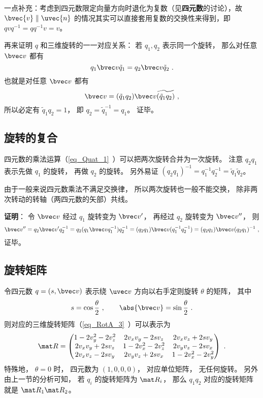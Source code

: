 一点补充：考虑到四元数限定向量方向时退化为复数（见\textbf{四元数}的讨论），故 $\bvec{v}\parallel{\uvec{n}}$ 的情况其实可以直接套用复数的交换性来得到，即 $qvq^{-1}=qq^{-1}v=v$。

再来证明 $q$ 和三维旋转的一一对应关系： 若 $q_1,q_2$ 表示同一个旋转， 那么对任意 $\bvec v$ 都有
\begin{equation}
q_1\bvec v \tilde q_1 = q_2\bvec v \tilde q_2~.
\end{equation}
也就是对任意 $\bvec v$ 都有
\begin{equation}
\bvec v = (\tilde q_1q_2)\bvec v \widetilde{(\tilde q_1q_2)}~,
\end{equation}
所以必定有 $\tilde q_1q_2 = 1$， 即 $q_2 = \tilde q_1^{-1} = q_1$。 证毕。

\subsection{旋转的复合}
四元数的乘法运算（\autoref{eq_Quat_1}~）可以把两次旋转合并为一次旋转。 注意 $q_2q_1$ 表示先做 $q_1$ 的旋转， 再做 $q_2$ 的旋转。 另外易证 $(q_2q_1)^{-1} = q_1^{-1} q_2^{-1} = \tilde q_1\tilde q_2$。

由于一般来说四元数乘法不满足交换律， 所以两次旋转也一般不能交换， 除非两次转动的转轴（两四元数的矢部）共线。

\textbf{证明}： 令 $\bvec v$ 经过 $q_1$ 旋转变为 $\bvec v'$， 再经过 $q_2$ 旋转变为 $\bvec v''$， 则
\begin{equation}
\bvec v'' = q_2\bvec v'q_2^{-1} = q_2(q_1\bvec vq_1^{-1}) q_2^{-1} = (q_2q_1)\bvec v(q_1^{-1} q_2^{-1}) = (q_2q_1)\bvec v(q_2q_1)^{-1}~,
\end{equation}
证毕。

\subsection{旋转矩阵}
令四元数 $q = (s, \bvec v)$ 表示绕 $\uvec v$ 方向以右手定则旋转 $\theta$ 的矩阵， 其中
\begin{equation}
s = \cos\frac{\theta}{2} ~,\qquad
\abs{\bvec v} = \sin\frac{\theta}{2}~.
\end{equation}
则对应的三维旋转矩阵（\autoref{eq_RotA_3}~）可以表示为
\begin{equation}\label{eq_QuatN_2}
\mat R =
\begin{pmatrix}
1 - 2v_y^2 - 2v_z^2 & 2v_xv_y - 2sv_z  & 2v_x v_z + 2s v_y\\
2v_x v_y + 2sv_z & 1 - 2v_x^2 - 2v_z^2 & 2v_y v_z - 2s v_x\\
2v_x v_z - 2s v_y & 2v_y v_z + 2s v_x & 1 - 2v_x^2 - 2v_y^2
\end{pmatrix}~.
\end{equation}
特殊地， $\theta = 0$ 时， 四元数为 $(1,0,0,0)$， 对应单位矩阵， 无任何旋转。 另外由上一节的分析可知， 若 $q_i$ 的旋转矩阵为 $\mat R_i$， 那么 $q_1q_2$ 对应的旋转矩阵就是 $\mat R_1\mat R_2$。

